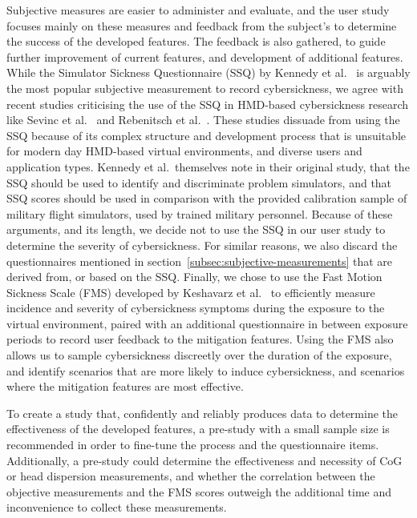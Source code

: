 Subjective measures are easier to administer and evaluate, and the user study focuses mainly on these measures and
feedback from the subject's to determine the success of the developed features.
The feedback is also gathered, to guide further improvement of current features, and development of additional
features.
While the Simulator Sickness Questionnaire (SSQ) by Kennedy et al.~\cite{Kennedy1993} is arguably the most popular
subjective measurement to record cybersickness, we agree with recent studies criticising the use of the SSQ in
HMD-based cybersickness research like Sevinc et al.~\cite{Sevinc2020} and Rebenitsch et al.~\cite{Rebenitsch2016}.
These studies dissuade from using the SSQ because of its complex structure and development process that is unsuitable
for modern day HMD-based virtual environments, and diverse users and application types.
Kennedy et al.\ themselves note in their original study, that the SSQ should be used to identify and discriminate
problem simulators, and that SSQ scores should be used in comparison with the provided calibration sample of
military flight simulators, used by trained military personnel.
Because of these arguments, and its length, we decide not to use the SSQ in our user study to determine the severity
of cybersickness.
For similar reasons, we also discard the questionnaires mentioned in section~\ref{subsec:subjective-measurements}
that are derived from, or based on the SSQ\@.
Finally, we chose to use the Fast Motion Sickness Scale (FMS) developed by Keshavarz et al.~\cite{Keshavarz2011} to
efficiently measure incidence and severity of cybersickness symptoms during the exposure to the virtual environment,
paired with an additional questionnaire in between exposure periods to record user feedback to the mitigation features.
Using the FMS also allows us to sample cybersickness discreetly over the duration of the exposure, and identify
scenarios that are more likely to induce cybersickness, and scenarios where the mitigation features are most effective.

To create a study that, confidently and reliably produces data to determine the effectiveness of the developed
features, a pre-study with a small sample size is recommended in order to fine-tune the process and the
questionnaire items.
Additionally, a pre-study could determine the effectiveness and necessity of CoG or head dispersion measurements, and
whether the correlation between the objective measurements and the FMS scores outweigh the additional time and
inconvenience to collect these measurements.


